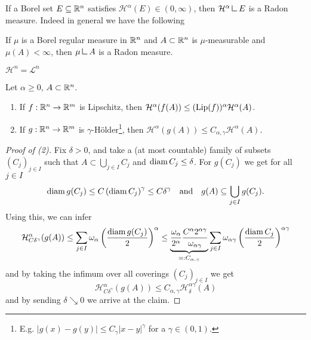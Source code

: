 If a Borel set $E \subseteq \mathbb{R}^n$ satisfies $\mathcal{H}^\alpha(E) \in
(0,\infty)$, then $\mathcal{H}^\alpha \mres E$ is a Radon measure. Indeed in
general we have the following

\begin{theorem}
If $\mu$ is a Borel regular measure in $\mathbb{R}^n$ and $A \subset \mathbb{R}^n$ is
$\mu$-measurable and $\mu(A) < \infty$, then $\mu \mres A$ is a Radon measure. 
\end{theorem}

\begin{theorem}
$\mathcal{H}^n = \mathcal{L}^n$
\end{theorem}

\begin{proposition}
Let $\alpha \geq 0$, $A \subset \mathbb{R}^n$.
\begin{enumerate}[(1)]
\item If $f : \mathbb{R}^n \to \mathbb{R}^m$ is Lipschitz, then $\mathcal{H}^\alpha(f(A)) \leq
(\operatorname{Lip}(f))^\alpha \mathcal{H}^\alpha(A)$.
\item If $g : \mathbb{R}^n \to \mathbb{R}^m$ is $\gamma$-Hölder\footnote{E.g. $|g(x) - g(y)| \leq
C_\gamma |x-y|^\gamma$ for a $\gamma \in (0,1)$.}, then $\mathcal{H}^\alpha(g(A)) \leq
C_{\alpha,\gamma} \mathcal{H}^\alpha(A)$.
\end{enumerate}
\end{proposition}

\begin{proof}[Proof of (2)]
Fix $\delta > 0$, and take a (at most countable) family of subsets $(C_j)_{j\in I}$
such that $ A \subset \bigcup_{j\in I} C_j$ and $\operatorname{diam} C_j \leq \delta$.
For $g(C_j)$ we get for all $j\in I$
\[
\begin{aligned}
\operatorname{diam} g(C_j)\leq C \left(\operatorname{diam} C_j\right)^\gamma \leq C \delta^\gamma
\quad \text{and} \quad
g(A) \subseteq \bigcup_{j\in I} g(C_j).
\end{aligned}
\]
Using this, we can infer
\[
\begin{aligned}
\mathcal{H}^\alpha_{C \delta^\gamma}(g(A)) \leq \sum_{j\in I} \omega_\alpha
\left(\frac{\operatorname{diam} g(C_j)}{2}\right)^\alpha
\leq 
\underbrace{\frac{\omega_\alpha}{2^\alpha} \frac{C^\alpha
2^{\alpha\gamma}}{\omega_{\alpha\gamma}}}_{=: C_{\alpha,\gamma}} \sum_{j\in I} \omega_{\alpha \gamma} 
\left(\frac{\operatorname{diam} C_j}{2}\right)^{\alpha\gamma}
\end{aligned}
\]
and by taking the infimum over all coverings $(C_j)_{j\in I}$ we get
\[
\mathcal{H}^\alpha_{C\delta^\gamma} (g(A)) \leq C_{\alpha,\gamma}
\mathcal{H}^{\alpha\gamma}_\delta (A)
\]
and by sending $\delta \searrow 0 $ we arrive at the claim.
\end{proof}
